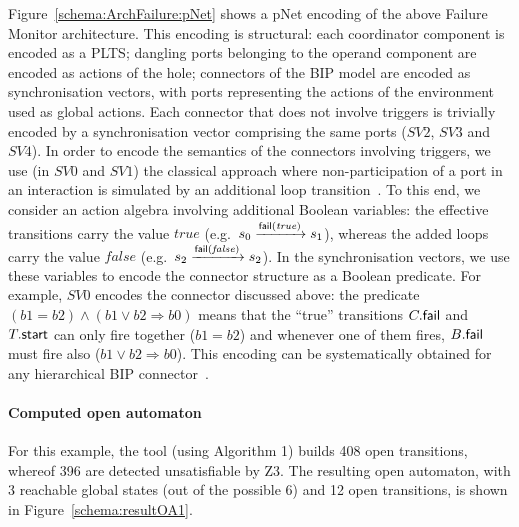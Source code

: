 \documentclass[smallcondensed]{svjour3}
\newcommand{\noteSB}[2][color=green!40, size=\tiny]{\todo[#1]{{\bf Simon: } {#2}}}
\newcommand{\noteEM}[2][color=blue!40, size=\tiny]{\todo[#1]{{\bf Eric: } {#2}}}
\newcommand{\eg}[1][\ ]{e.g.#1}
\newcommand{\goesto}[2][]{\ensuremath{\xrightarrow[#1]{#2}}}
\newcommand{\true}{\ensuremath{\mathit{true}}}
\newcommand{\false}{\ensuremath{\mathit{false}}}
\begin{document}
Figure~\ref{schema:ArchFailure:pNet} shows a pNet encoding of the
above Failure Monitor architecture.  This encoding is structural: each
coordinator component is encoded as a PLTS; dangling ports belonging
to the operand component are encoded as actions of the hole; 
connectors of the BIP model are encoded as synchronisation vectors,
with ports
  representing the actions of the environment used as global actions.
Each connector that does not involve triggers is trivially encoded by
a synchronisation vector comprising the same ports ($SV2$, $SV3$ and
$SV4$).  In order to encode the semantics of the connectors involving
triggers, we use (in $SV0$ and $SV1$) the classical approach where
non-participation of a port in an interaction is simulated by an
additional loop transition~\cite{milner83-calculi}.  To this end, we
consider an action algebra involving additional Boolean variables: the
effective transitions carry the value $\true$ (\eg $\cstate{0}
\goesto{\PortFail(\true)} \cstate{1}$), whereas the added loops carry
the value $\false$ (\eg $\cstate{2} \goesto{\PortFail(\false)}
\cstate{2}$).  In the synchronisation vectors, we use these variables
to encode the connector structure as a Boolean predicate.  For
example, $SV0$ encodes the connector discussed above: the predicate
$(b1=b2) \land (b1\lor b2 \Rightarrow b0)$ means that the ``true''
transitions $C.\mathsf{fail}$ and $T.\mathsf{start}$ can only
fire together ($b1 = b2$) and whenever one of them fires,
$B.\mathsf{fail}$ must fire also ($b1 \lor b2 \Rightarrow b0$).
This encoding can be systematically obtained for any hierarchical BIP
connector~\cite{BliSif10-causal-fmsd}.
%



\paragraph{Computed open automaton}

For this example, the tool (using Algorithm 1) builds 408 open transitions, whereof 396
are detected unsatisfiable by Z3.  The resulting open automaton, with
3 reachable global states (out of the possible 6) and 12 open
transitions, is shown in Figure~\ref{schema:resultOA1}.
\end{document}
